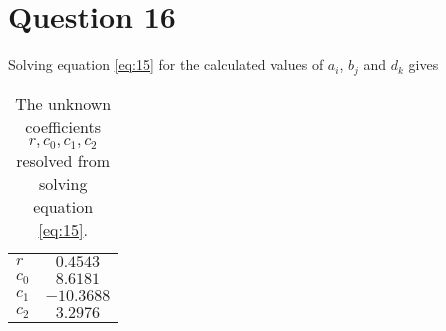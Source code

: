 \section{Question 16}

Solving equation \ref{eq:15} for the calculated values of $a_i$, $b_j$ and $d_k$
gives

\begin{table}[H]\centering
  \begin{tabular}{l|c}
  $r$     & $0.4543$    \\
  $c_0$   & $8.6181$    \\
  $c_1$   & $-10.3688$  \\
  $c_2$   & $3.2976$    \\
  \end{tabular}
  \caption{The unknown coefficients $r, c_0, c_1, c_2$ resolved from solving
    equation \ref{eq:15}.}
  \label{tbl:16}
\end{table}
